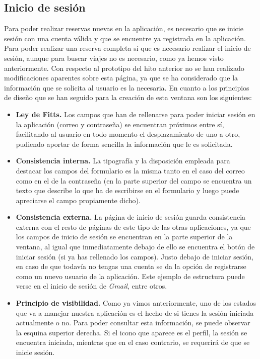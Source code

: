 \subsection*{Inicio de sesión}

Para poder realizar reservas nuevas en la aplicación, es necesario que se inicie sesión con
una cuenta válida y que se encuentre ya registrada en la aplicación. Para poder realizar una
reserva completa sí que es necesario realizar el inicio de sesión, aunque para buscar viajes
no es necesario, como ya hemos visto anteriormente. Con respecto al prototipo del hito anterior
no se han realizado modificaciones aparentes sobre esta página, ya que se ha considerado que
la información que se solicita al usuario es la necesaria. En cuanto a los principios de diseño
que se han seguido para la creación de esta ventana son los siguientes:

\begin{itemize}
    \item \textbf{Ley de Fitts.} Los campos que han de rellenarse para poder iniciar sesión en la
        aplicación (correo y contraseña) se encuentran próximos entre sí, facilitando al
        usuario en todo momento el desplazamiento de uno a otro, pudiendo aportar de forma
        sencilla la información que le es solicitada.
    \item \textbf{Consistencia interna.} La tipografía y la disposición empleada para destacar los campos
        del formulario es la misma tanto en el caso del correo como en el de la contraseña (en
        la parte superior del campo se encuentra un texto que describe lo que ha de escribirse
        en el formulario y luego puede apreciarse el campo propiamente dicho).
    \item \textbf{Consistencia externa.} La página de inicio de sesión guarda consistencia externa con
        el resto de páginas de este tipo de las otras aplicaciones, ya que los campos de inicio
        de sesión se encuentran en la parte superior de la ventana, al igual que inmediatamente
        debajo de ello se encuentra el botón de iniciar sesión (si ya has rellenado los campos).
        Justo debajo de iniciar sesión, en caso de que todavía no tengas una cuenta se da la
        opción de registrarse como un nuevo usuario de la aplicación. Este ejemplo de estructura
        puede verse en el inicio de sesión de \textit{Gmail}, entre otros.
    \item \textbf{Principio de visibilidad.} Como ya vimos anteriormente, uno de los estados que va a
        manejar nuestra aplicación es el hecho de si tienes la sesión iniciada actualmente o no.
        Para poder consultar esta información, se puede observar la esquina superior derecha. Si
        el icono que aparece es el perfil, la sesión se encuentra iniciada, mientras que en el
        caso contrario, se requerirá de que se inicie sesión.
\end{itemize}

